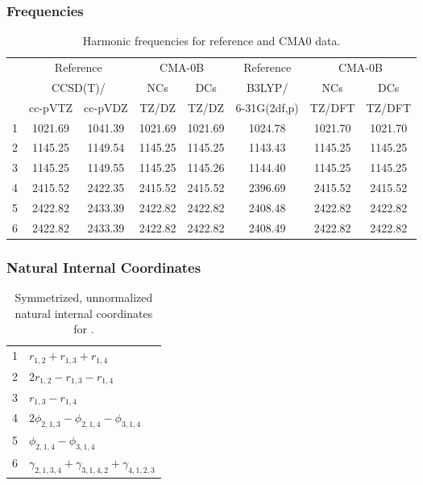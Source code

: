 \documentclass[10pt,oneside]{article}
\begin{document}
\subsubsection*{Frequencies}
\begin{table}[h!]
\centering
\caption{Harmonic frequencies for reference and CMA0 data.}
\begin{tabular}{cccccccc}
\toprule
{} & \multicolumn{2}{c}{Reference} & \multicolumn{2}{c}{CMA-0B} &    Reference & \multicolumn{2}{c}{CMA-0B} \\
{} & \multicolumn{2}{c}{CCSD(T)/} &     NCs &     DCs &       B3LYP/ &     NCs &     DCs \\
{} &   cc-pVTZ & cc-pVDZ &   TZ/DZ &   TZ/DZ & 6-31G(2df,p) &  TZ/DFT &  TZ/DFT \\
\midrule
1 &   1021.69 & 1041.39 & 1021.69 & 1021.69 &      1024.78 & 1021.70 & 1021.70 \\
2 &   1145.25 & 1149.54 & 1145.25 & 1145.25 &      1143.43 & 1145.25 & 1145.25 \\
3 &   1145.25 & 1149.55 & 1145.25 & 1145.26 &      1144.40 & 1145.25 & 1145.25 \\
4 &   2415.52 & 2422.35 & 2415.52 & 2415.52 &      2396.69 & 2415.52 & 2415.52 \\
5 &   2422.82 & 2433.39 & 2422.82 & 2422.82 &      2408.48 & 2422.82 & 2422.82 \\
6 &   2422.82 & 2433.39 & 2422.82 & 2422.82 &      2408.49 & 2422.82 & 2422.82 \\
\bottomrule
\end{tabular}
\end{table}

\clearpage

\subsubsection*{Natural Internal Coordinates}
\begin{table}[h!]
\centering
\caption{Symmetrized, unnormalized natural internal coordinates for .}
\small
\begin{tabular}{ll}
  1   & $r_{1,2} + r_{1,3} + r_{1,4}$ \\
  2   & $2r_{1,2} - r_{1,3} - r_{1,4}$ \\
  3   & $r_{1,3} - r_{1,4}$ \\
  4   & $2\phi_{2,1,3} - \phi_{2,1,4} - \phi_{3,1,4}$ \\
  5   & $\phi_{2,1,4} - \phi_{3,1,4}$ \\
  6   & $\gamma_{2,1,3,4} + \gamma_{3,1,4,2} + \gamma_{4,1,2,3}$ \\
\end{tabular}
\end{table}
\end{document}
